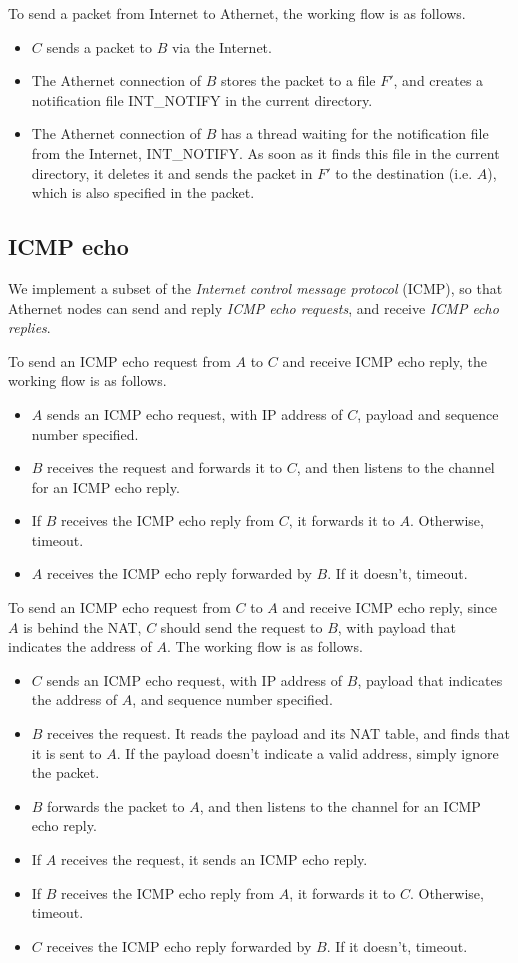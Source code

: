 \documentclass[11pt, conference]{IEEEtran}
\begin{document}
To send a packet from Internet to Athernet, the working flow is as follows.
\begin{itemize}
\item $C$ sends a packet to $B$ via the Internet.
\item The Athernet connection of $B$ stores the packet to a file $F'$, and creates a notification file \textsf{INT\_NOTIFY} in the current directory.
\item The Athernet connection of $B$ has a thread waiting for the notification file from the Internet, \textsf{INT\_NOTIFY}. As soon as it finds this file in the current directory, it deletes it and sends the packet in $F'$ to the destination (i.e. $A$), which is also specified in the packet.
\end{itemize}

\subsection{ICMP echo}

We implement a subset of the \emph{Internet control message protocol} (ICMP), so that Athernet nodes can send and reply \emph{ICMP echo requests}, and receive \emph{ICMP echo replies}.

To send an ICMP echo request from $A$ to $C$ and receive ICMP echo reply, the working flow is as follows.
\begin{itemize}
\item $A$ sends an ICMP echo request, with IP address of $C$, payload and sequence number specified.
\item $B$ receives the request and forwards it to $C$, and then listens to the channel for an ICMP echo reply.
\item If $B$ receives the ICMP echo reply from $C$, it forwards it to $A$. Otherwise, timeout.
\item $A$ receives the ICMP echo reply forwarded by $B$. If it doesn't, timeout.
\end{itemize}

To send an ICMP echo request from $C$ to $A$ and receive ICMP echo reply, since $A$ is behind the NAT, $C$ should send the request to $B$, with payload that indicates the address of $A$. The working flow is as follows.
\begin{itemize}
\item $C$ sends an ICMP echo request, with IP address of $B$, payload that indicates the address of $A$, and sequence number specified.
\item $B$ receives the request. It reads the payload and its NAT table, and finds that it is sent to $A$. If the payload doesn't indicate a valid address, simply ignore the packet.
\item $B$ forwards the packet to $A$, and then listens to the channel for an ICMP echo reply.
\item If $A$ receives the request, it sends an ICMP echo reply.
\item If $B$ receives the ICMP echo reply from $A$, it forwards it to $C$. Otherwise, timeout.
\item $C$ receives the ICMP echo reply forwarded by $B$. If it doesn't, timeout.
\end{itemize}
\end{document}
